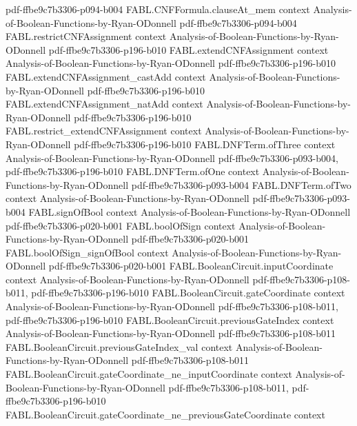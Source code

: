 \begin{theorem}
  {pdf-ffbe9c7b3306-p094-b004}
\proofstep
  {FABL.CNFFormula.clauseAt_mem}
  {context}
  {Analysis-of-Boolean-Functions-by-Ryan-ODonnell}
  {pdf-ffbe9c7b3306-p094-b004}
\proofstep
  {FABL.restrictCNFAssignment}
  {context}
  {Analysis-of-Boolean-Functions-by-Ryan-ODonnell}
  {pdf-ffbe9c7b3306-p196-b010}
\proofstep
  {FABL.extendCNFAssignment}
  {context}
  {Analysis-of-Boolean-Functions-by-Ryan-ODonnell}
  {pdf-ffbe9c7b3306-p196-b010}
\proofstep
  {FABL.extendCNFAssignment_castAdd}
  {context}
  {Analysis-of-Boolean-Functions-by-Ryan-ODonnell}
  {pdf-ffbe9c7b3306-p196-b010}
\proofstep
  {FABL.extendCNFAssignment_natAdd}
  {context}
  {Analysis-of-Boolean-Functions-by-Ryan-ODonnell}
  {pdf-ffbe9c7b3306-p196-b010}
\proofstep
  {FABL.restrict_extendCNFAssignment}
  {context}
  {Analysis-of-Boolean-Functions-by-Ryan-ODonnell}
  {pdf-ffbe9c7b3306-p196-b010}
\proofstep
  {FABL.DNFTerm.ofThree}
  {context}
  {Analysis-of-Boolean-Functions-by-Ryan-ODonnell}
  {pdf-ffbe9c7b3306-p093-b004,
    pdf-ffbe9c7b3306-p196-b010}
\proofstep
  {FABL.DNFTerm.ofOne}
  {context}
  {Analysis-of-Boolean-Functions-by-Ryan-ODonnell}
  {pdf-ffbe9c7b3306-p093-b004}
\proofstep
  {FABL.DNFTerm.ofTwo}
  {context}
  {Analysis-of-Boolean-Functions-by-Ryan-ODonnell}
  {pdf-ffbe9c7b3306-p093-b004}
\proofstep
  {FABL.signOfBool}
  {context}
  {Analysis-of-Boolean-Functions-by-Ryan-ODonnell}
  {pdf-ffbe9c7b3306-p020-b001}
\proofstep
  {FABL.boolOfSign}
  {context}
  {Analysis-of-Boolean-Functions-by-Ryan-ODonnell}
  {pdf-ffbe9c7b3306-p020-b001}
\proofstep
  {FABL.boolOfSign_signOfBool}
  {context}
  {Analysis-of-Boolean-Functions-by-Ryan-ODonnell}
  {pdf-ffbe9c7b3306-p020-b001}
\proofstep
  {FABL.BooleanCircuit.inputCoordinate}
  {context}
  {Analysis-of-Boolean-Functions-by-Ryan-ODonnell}
  {pdf-ffbe9c7b3306-p108-b011,
    pdf-ffbe9c7b3306-p196-b010}
\proofstep
  {FABL.BooleanCircuit.gateCoordinate}
  {context}
  {Analysis-of-Boolean-Functions-by-Ryan-ODonnell}
  {pdf-ffbe9c7b3306-p108-b011,
    pdf-ffbe9c7b3306-p196-b010}
\proofstep
  {FABL.BooleanCircuit.previousGateIndex}
  {context}
  {Analysis-of-Boolean-Functions-by-Ryan-ODonnell}
  {pdf-ffbe9c7b3306-p108-b011}
\proofstep
  {FABL.BooleanCircuit.previousGateIndex_val}
  {context}
  {Analysis-of-Boolean-Functions-by-Ryan-ODonnell}
  {pdf-ffbe9c7b3306-p108-b011}
\proofstep
  {FABL.BooleanCircuit.gateCoordinate_ne_inputCoordinate}
  {context}
  {Analysis-of-Boolean-Functions-by-Ryan-ODonnell}
  {pdf-ffbe9c7b3306-p108-b011,
    pdf-ffbe9c7b3306-p196-b010}
\proofstep
  {FABL.BooleanCircuit.gateCoordinate_ne_previousGateCoordinate}
  {context}

\end{theorem}
